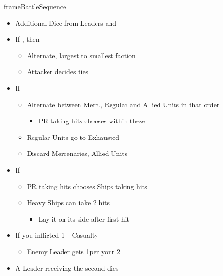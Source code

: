 \documentclass[10pt]{article}
\newlength{\fhBattleSequence} \setlength\fhBattleSequence{31\baselineskip}
\begin{document}
\begin{dynamiccontents*}{frameBattleSequence}
\begin{eubox}{\fhBattleSequence}
\begin{multicols}{3}
\begin{itemize}
			\begin{itemize}
				\item Default 3\artillery Dice
				\item 1 automatic hit per Heavy Ship 
			\end{itemize}
			\item Additional Dice from Leaders and \battleactions
		\end{itemize}
		\begin{itemize}
			\item If , then
			\begin{itemize}
				\item Alternate, largest to smallest faction
				\item Attacker decides ties
			\end{itemize}
			\item If 
			\begin{itemize}
				\item Alternate between Merc., Regular and Allied Units in that order
				\begin{itemize}
					\item PR taking hits chooses within these
				\end{itemize}
				\item Regular Units go to Exhausted \manpower
				\item Discard Mercenaries, Allied Units
			\end{itemize}
			\item If 
			\begin{itemize}
				\item PR taking hits chooses Ships taking hits
				\item Heavy Ships can take 2 hits
				\begin{itemize}
					\item Lay it on its side after first hit
				\end{itemize}
			\end{itemize}
		\end{itemize}
		\begin{itemize}
			\item If you inflicted 1+ Casualty
			\begin{itemize}
				\item Enemy Leader gets 1\illhealth per your 2\tercios
			\end{itemize}
			\item A Leader receiving the second \illhealth dies

\end{itemize}
\end{multicols}
\end{eubox}
\end{dynamiccontents*}
\end{document}
